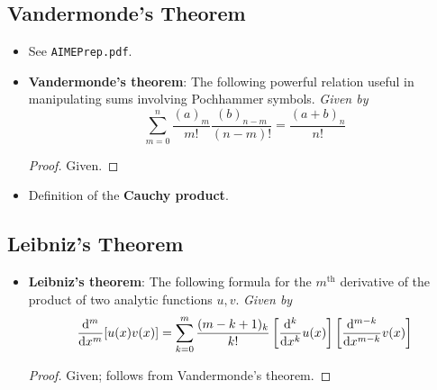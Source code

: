 \documentclass[../finalProject.tex]{subfiles}
\begin{document}
\subsection{Vandermonde's Theorem}
\begin{itemize}
    \item See \verb|AIMEPrep.pdf|.
    \item \textbf{Vandermonde's theorem}: The following powerful relation useful in manipulating sums involving Pochhammer symbols. \emph{Given by}
    \begin{equation*}
        \sum_{m=0}^n\frac{(a)_m}{m!}\frac{(b)_{n-m}}{(n-m)!} = \frac{(a+b)_n}{n!}
    \end{equation*}
    \begin{proof}
        Given.
    \end{proof}
    \item Definition of the \textbf{Cauchy product}.
\end{itemize}


\subsection{Leibniz's Theorem}
\begin{itemize}
    \item \textbf{Leibniz's theorem}: The following formula for the $m^\text{th}$ derivative of the product of two analytic functions $u,v$. \emph{Given by}
    \begin{equation*}
        \dv[m]{x}[u(x)v(x)] = \sum_{k=0}^m\frac{(m-k+1)_k}{k!}\left[ \dv[k]{x}u(x) \right]\left[ \dv[m-k]{x}v(x) \right]
    \end{equation*}
    \begin{proof}
        Given; follows from Vandermonde's theorem.
    \end{proof}
\end{itemize}
\end{document}
